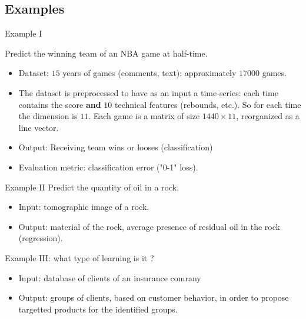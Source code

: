 \documentclass[usenames,dvipsnames]{beamer}
\begin{document}
\subsection{Examples}%
\label{sub:examples}

\begin{frame}{Example I}

    Predict the winning team of an NBA game at half-time.
\begin{itemize}
    \item Dataset: $15$ years of games (comments, text): approximately $17000$
        games.
    \item The dataset is preprocessed to have as an input a time-series: each
        time contains the score \textbf{{and}}  $10$ technical features (rebounds, etc.).
        So for each time the dimension is $11$. Each game is a matrix of size $
        1440\times 11$, reorganized as a line vector.
    \item Output: Receiving team wins or looses (classification)
    \item Evaluation metric: classification error ("0-1" loss).
\end{itemize}
    
\end{frame}

\begin{frame}{Example II}
    Predict the quantity of oil in a rock.
    \begin{itemize}
        \item Input: tomographic image of a rock.
        \item Output: material of the rock, average presence of residual oil in
            the rock (regression).
    \end{itemize}
\end{frame}

\begin{frame}{Example III: what type of learning is it ?}

    \begin{itemize}
    	\item Input: database of clients of an insurance comrany
	\item Output: groups of clients, based on customer behavior, in order to propose targetted products for the identified groups.
    \end{itemize}

\end{frame}
\end{document}

